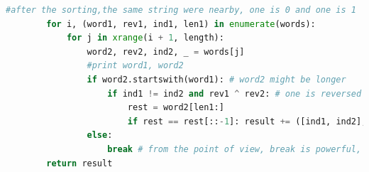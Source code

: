 \documentclass[data-structure.tex]{subfiles}
\begin{document}
\begin{examples}
\begin{lstlisting}[language = Python]
        #after the sorting,the same string were nearby, one is 0 and one is 1
        for i, (word1, rev1, ind1, len1) in enumerate(words):
            for j in xrange(i + 1, length):
                word2, rev2, ind2, _ = words[j]
                #print word1, word2
                if word2.startswith(word1): # word2 might be longer 
                    if ind1 != ind2 and rev1 ^ rev2: # one is reversed one is not
                        rest = word2[len1:]
                        if rest == rest[::-1]: result += ([ind1, ind2],) if rev2 else ([ind2, ind1],) # if rev2 is reversed, the from ind1 to ind2
                else:
                    break # from the point of view, break is powerful, this way, we only deal with possible reversed, 
        return result
 \end{lstlisting}
 \end{examples}
 

 
     
 
     
 
         
         
 
 
         
 
\end{document}
